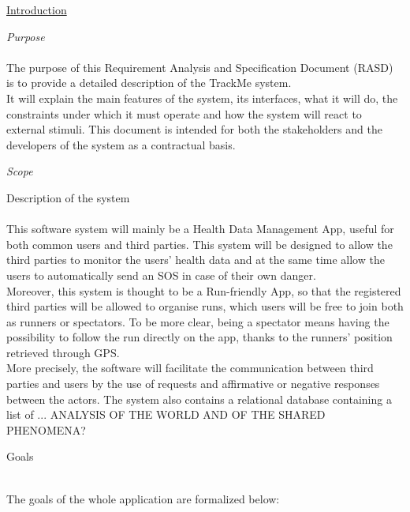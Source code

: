 \documentclass{article}
\begin{document}
\newpage
	\begin{legal}\bfseries
 	\item \underline{Introduction} 
  		\begin{legal}
    		\item \textit{Purpose}\\
		\\
		{\normalfont
		The purpose of this Requirement Analysis and Specification Document (RASD) is to provide a detailed description of the TrackMe system.\\ 
		It will explain the main features of the system, its interfaces, what it will do, the constraints under which it must operate and how the system will react to external stimuli. This document is intended for both the stakeholders and the developers of the system as a contractual basis.
		}\\
		\item \textit{Scope}\\
			\begin{legal}
    		\item Description of the system \\\\
			{\normalfont
This software system will mainly be a Health Data Management App, useful for both common users and third parties. This system will be designed to allow the third parties to monitor the users' health data and at the same time allow the users to automatically send an SOS in case of their own danger.\\
Moreover, this system is thought to be a Run-friendly App, so that the registered third parties will be allowed to organise runs, which users will be free to join both as runners or spectators. To be more clear, being a spectator means having the possibility to follow the run directly on the app, thanks to the runners' position retrieved through GPS.\\
More precisely, the software will facilitate the communication between third parties and users by the use of requests and affirmative or negative responses between the actors.
The system also contains a relational database containing a list of ... ANALYSIS OF THE WORLD AND OF THE SHARED PHENOMENA?
			}\\
			\item Goals \\\\
			{\normalfont
			The goals of the whole application are formalized below:\\
				\begin{itemize}

\end{itemize}}
\end{legal}
\end{legal}
\end{legal}
\end{document}
